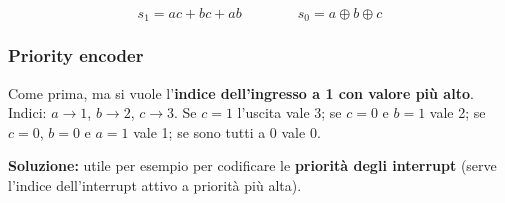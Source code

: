 \documentclass[12pt, a4paper]{article}
\begin{document}
\[ s_1 = ac + bc + ab \qquad\qquad s_0 = a \oplus b \oplus c \]

\subsubsection{Priority encoder}
\begin{tcolorbox}[colback=lightergray!10, colframe=tocsec, title=\textbf{Esercizio: priority encoder a 3 ingressi}]
Come prima, ma si vuole l'\textbf{indice dell'ingresso a 1 con valore più alto}. Indici: $a \to 1$, $b \to 2$, $c \to 3$. Se $c = 1$ l'uscita vale 3; se $c = 0$ e $b = 1$ vale 2; se $c = 0$, $b = 0$ e $a = 1$ vale 1; se sono tutti a 0 vale 0.
\end{tcolorbox}

\textbf{Soluzione:} utile per esempio per codificare le \textbf{priorità degli interrupt} (serve l'indice dell'interrupt attivo a priorità più alta).
\end{document}

